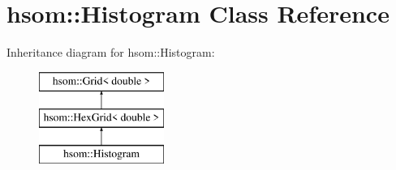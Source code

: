 \hypertarget{classhsom_1_1_histogram}{\section{hsom\-:\-:\-Histogram \-Class \-Reference}
\label{classhsom_1_1_histogram}
}
\-Inheritance diagram for hsom\-:\-:\-Histogram\-:\begin{figure}[H]
\begin{center}
\leavevmode
\includegraphics[height=3.000000cm]{classhsom_1_1_histogram}
\end{center}
\end{figure}
